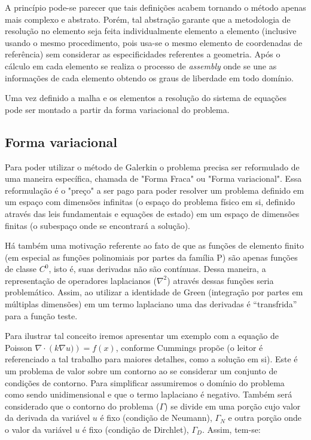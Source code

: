     A princípio pode-se parecer que tais definições acabem tornando o método
    apenas mais complexo e abstrato. Porém, tal abstração garante que a
    metodologia de resolução no elemento seja feita individualmente elemento a
    elemento (inclusive usando o mesmo procedimento, pois usa-se o mesmo
    elemento de coordenadas de referência) sem considerar as especificidades
    referentes a geometria. Após o cálculo em cada elemento se realiza o
    processo de \textit{assembly} onde se une as informações de cada elemento
    obtendo os graus de liberdade em todo domínio.

    Uma vez definido a malha e os elementos a resolução do sistema de equações
    pode ser montado a partir da forma variacional do problema.

    \subsection{Forma variacional}
        Para poder utilizar o método de Galerkin o problema precisa ser reformulado
    de uma maneira específica, chamada de "Forma Fraca" ou "Forma variacional".
    Essa reformulação é o "preço" a ser pago para poder resolver um problema
    definido em um espaço com dimensões infinitas (o espaço do problema físico
    em si, definido através das leis fundamentais e equações de estado) em um
    espaço de dimensões finitas (o subespaço onde se encontrará a solução).

    Há também uma motivação referente ao fato de que as funções de elemento finito
    (em especial as funções polinomiais por partes da família P) são apenas
    funções de classe $C^0$, isto é, suas derivadas não são contínuas. Dessa
    maneira, a representação de operadores laplacianos ($\nabla^2$) através
    dessas funções seria problemático. Assim, ao utilizar a identidade de Green
    (integração por partes em múltiplas dimensões) em um termo laplaciano uma
    das derivadas é ``transfrida'' para a função teste.

    Para ilustrar tal conceito iremos apresentar um exemplo com a equação de
    Poisson $\nabla \cdot \left(k \nabla u) \right) = f(x)$, conforme Cummings
    propõe \cite{cummings2016modeling} (o leitor é referenciado a tal trabalho para
    maiores detalhes, como a solução em si). Este é um
    problema de valor sobre um contorno ao se considerar um conjunto de
    condições de contorno. Para simplificar assumiremos o domínio do problema
    como sendo unidimensional e que o termo laplaciano é negativo. Também será
    considerado que o contorno do problema ($\Gamma$) se divide em uma porção
    cujo valor da derivada da variável $u$ é fixo (condição de Neumann),
    $\Gamma_N$  e outra porção onde o valor da variável $u$ é fixo (condição de
    Dirchlet), $\Gamma_D$. Assim,
    tem-se:

